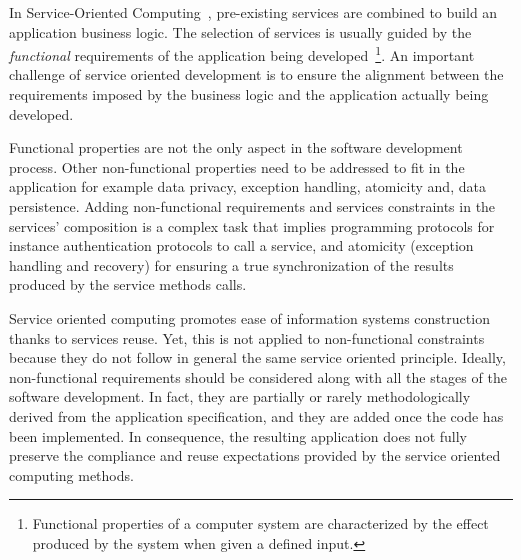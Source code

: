 




In Service-Oriented Computing~\cite{Papazoglou2007}, pre-existing services are
combined to build an application business logic.
The selection of services is usually guided by the \textit{functional} requirements of the application being developed~\cite{1,2,decastro1,PapazoglouH06}\footnote{Functional properties of a computer system are characterized by the effect produced by the system when given a defined input.}.
An important challenge of service oriented development is  to ensure the alignment between the requirements imposed by the business logic and the application actually being developed.

Functional properties are not the only  aspect in the software development process.
Other non-functional properties need to be addressed to fit in the application for example  data privacy, exception handling, atomicity  and, data persistence.
Adding non-functional requirements and services constraints in the services' composition is a complex task that implies programming  protocols for instance authentication protocols to call a service, and atomicity (exception handling and recovery) for ensuring a true synchronization of the results produced by the service methods calls.

Service oriented computing promotes ease of information systems construction thanks to services reuse. Yet, this is not applied to non-functional constraints because they do not follow in general the same service oriented principle. 
%
Ideally, non-functional requirements should be considered along with all the stages of the software development.
In fact,  they are partially or rarely methodologically derived from the application specification, and they are added once the code has been implemented. In consequence, the resulting application does not fully preserve the compliance and reuse expectations provided by the service oriented computing methods.


